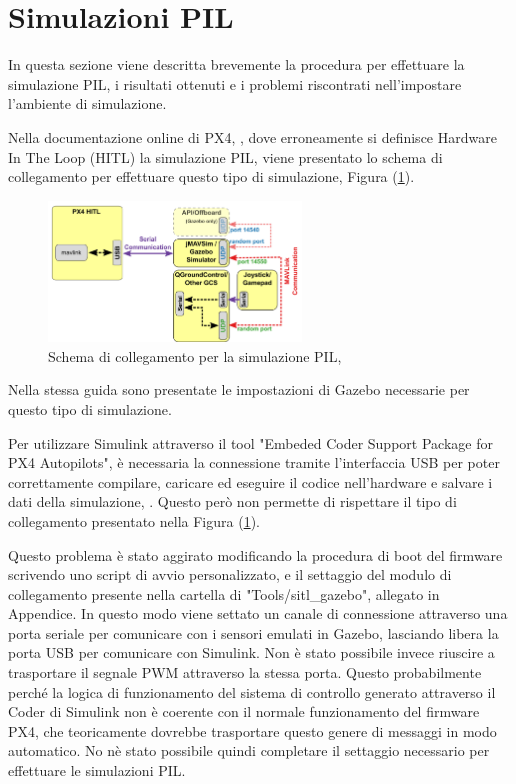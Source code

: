 \section{Simulazioni PIL}
In questa sezione viene descritta brevemente la procedura per effettuare la simulazione PIL, i risultati ottenuti e i problemi riscontrati nell'impostare l'ambiente di simulazione.

Nella documentazione online di PX4, \cite{PIL}, dove erroneamente si definisce Hardware In The Loop (HITL) la simulazione PIL, viene presentato lo schema di collegamento per effettuare questo tipo di simulazione, Figura (\ref{fig:PIL}).

\begin{figure}
	\centering
	\includegraphics[width=0.6\textwidth]{Simulazioni/Figure/PIL}
	\caption{Schema di collegamento per la simulazione PIL, \cite{PIL}}
	\label{fig:PIL}
\end{figure}

Nella stessa guida sono presentate le impostazioni di Gazebo necessarie per questo tipo di simulazione.

Per utilizzare Simulink attraverso il tool "Embeded Coder Support Package for PX4 Autopilots", è necessaria la connessione tramite l'interfaccia USB per poter correttamente compilare, caricare ed eseguire il codice nell'hardware e salvare i dati della simulazione, \cite{PX4MATLAB}. Questo però non permette di rispettare il tipo di collegamento presentato nella Figura (\ref{fig:PIL}). 

Questo problema è stato aggirato modificando la procedura di boot del firmware scrivendo uno script di avvio personalizzato, e il settaggio del modulo di collegamento presente nella cartella di "Tools/sitl\_gazebo", allegato in Appendice. In questo modo viene settato un canale di connessione attraverso una porta seriale per comunicare con i sensori emulati in Gazebo, lasciando libera la porta USB per comunicare con Simulink. Non è stato possibile invece riuscire a trasportare il segnale PWM attraverso la stessa porta. Questo probabilmente perché la logica di funzionamento del sistema di controllo generato attraverso il Coder di Simulink non è coerente con il normale funzionamento del firmware PX4, che teoricamente dovrebbe trasportare questo genere di messaggi in modo automatico. No nè stato possibile quindi completare il settaggio necessario per effettuare le simulazioni PIL.
